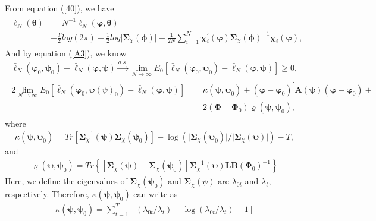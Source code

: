 \documentclass[12pt,a4paper,hyperref]{article}
\begin{document}
From equation (\ref{40}), we have
\begin{align}
\begin{split}
\bar{\ell}_{N}\left(\boldsymbol{\theta}\right)&=N^{-1} \ell_{N}(\boldsymbol{\varphi}, \boldsymbol{\theta})= \\
&-\frac{T}{2}log(2 \pi)-\frac{1}{2}log \vert \boldsymbol{\Sigma}_{\chi}(\boldsymbol{\phi}) \vert-\frac{1}{2N}\sum^{N}_{i=1} \boldsymbol{\chi}^{'}_{i}(\boldsymbol{\varphi})\boldsymbol{\Sigma}_{\chi}(\boldsymbol{\phi})^{-1}\boldsymbol{\chi}_{i}(\boldsymbol{\varphi}),
\end{split}
\end{align}
And by equation (\ref{A3}), we know
\begin{align}
\bar{\ell}_{N}(\boldsymbol{\varphi}_{0}, \boldsymbol{\psi}_{0})-\bar{\ell}_{N}(\boldsymbol{\varphi}, \boldsymbol{\psi}) \overset{a.s.}{\to}  \lim_{N\to \infty} E_{0}\left[\bar{\ell}_{N}(\boldsymbol{\varphi}_{0},\boldsymbol{\psi}_{0})-\bar{\ell}_{N}(\boldsymbol{\varphi}, \boldsymbol{\psi})   \right]\geq 0,
\end{align}
\begin{align}
\begin{split}
2\lim_{N \to \infty} E_{0}\left[\bar{\ell}_{N}(\boldsymbol{\varphi}_{0}, \boldsymbol{\psi}(\psi)_{0})-\bar{\ell}_{N}(\boldsymbol{\varphi}, \boldsymbol{\psi})  \right]=&\kappa(\boldsymbol{\psi}, \boldsymbol{\psi}_{0})+\left( \boldsymbol{\varphi}-\boldsymbol{\varphi}_{0} \right)^{'}\boldsymbol{A}(\boldsymbol{\psi})\left( \boldsymbol{\varphi}-\boldsymbol{\varphi}_{0} \right)+\\
&2\left( \boldsymbol{\Phi}-\boldsymbol{\Phi}_{0} \right)\varrho(\boldsymbol{\psi}, \boldsymbol{\psi}_{0}), \label{A4}
\end{split}
\end{align}
where
\begin{align}
\kappa\left(\boldsymbol{\psi}, \boldsymbol{\psi}_{0} \right)=Tr \left[ \boldsymbol{\Sigma}_{\chi}^{-1}(\boldsymbol{\psi})  \boldsymbol{\Sigma}_{\chi}(\boldsymbol{\psi}_{0})  \right]-\log \left( \vert \boldsymbol{\Sigma}_{\chi}(\boldsymbol{\psi}_{0})  \vert/\vert  \boldsymbol{\Sigma}_{\chi}(\boldsymbol{\psi})  \vert   \right)-T,
\end{align}
and
\begin{align}
\varrho(\boldsymbol{\psi}, \boldsymbol{\psi}_{0})=Tr\left\lbrace \left[ \boldsymbol{\Sigma}_{\chi}(\boldsymbol{\psi})-\boldsymbol{\Sigma}_{\chi}(\boldsymbol{\psi}_{0})  \right]\boldsymbol{\Sigma}^{-1}_{\chi}(\boldsymbol{\psi})\boldsymbol{LB}(\boldsymbol{\Phi}_{0})^{-1}\right\rbrace
\end{align}
Here, we define the eigenvalues of $\boldsymbol{\Sigma}_{\chi}(\boldsymbol{\psi}_{0})$ and $\boldsymbol{\Sigma}_{\chi}(\psi)$ are $\lambda_{0t}$ and $\lambda_{t}$, respectively. Therefore, $\kappa\left(\boldsymbol{\psi}, \boldsymbol{\psi}_{0} \right)$ can write as
\begin{align}
\kappa\left(\boldsymbol{\psi}, \boldsymbol{\psi}_{0} \right)=\sum^{T}_{t=1}\left[ (\lambda_{0t}/\lambda_{t})-\log (\lambda_{0t}/\lambda_{t})-1  \right]
\end{align}
\end{document}
